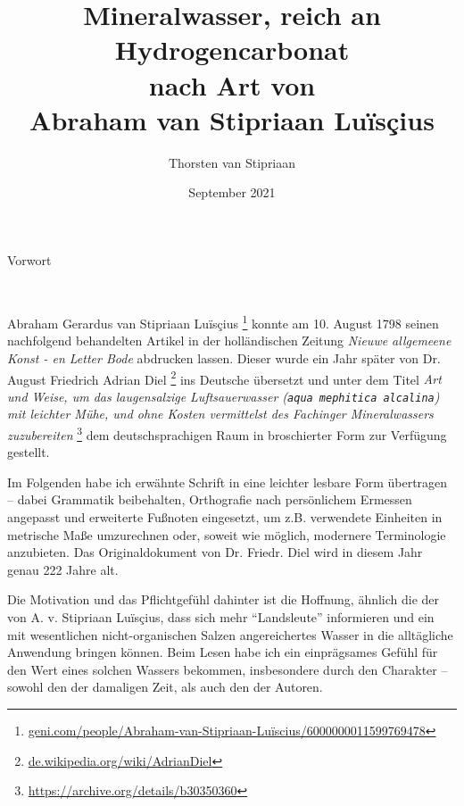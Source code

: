 \documentclass[a5paper,8pt]{scrbook}
\title{Mineralwasser, reich an Hydrogencarbonat\\nach Art von\\Abraham van Stipriaan Luïsçius}
\author{Thorsten van Stipriaan}
\date{September 2021}
\begin{document}

\maketitle

\newpage

{\centering
{\Large Vorwort}\vfill

\begin{minipage}{4cm}
  \centering
  \hrulefill\\
\end{minipage}

}
\vfill
Abraham Gerardus van Stipriaan Luïsçius%
\footnote{\href{https://web.archive.org/web/20210927050342/https://www.geni.com/people/Abraham-van-Stipriaan-Luïscius/6000000011599769478}
{geni.com/people/Abraham-van-Stipriaan-Luïscius/6000000011599769478}}
konnte am 10. August 1798
seinen nachfolgend behandelten Artikel in der holländischen Zeitung
\emph{Nieuwe allgemeene Konst - en Letter Bode}
abdrucken lassen.
Dieser wurde ein Jahr später
von Dr. August Friedrich Adrian Diel%
\footnote{\href{https://web.archive.org/web/20160828042236/https://de.wikipedia.org/wiki/Adrian_Diel}
{de.wikipedia.org/wiki/Adrian\textunderscore Diel}}
ins Deutsche übersetzt und unter dem Titel
\emph{Art und Weise,
um das laugensalzige Luftsauerwasser
(\texttt{aqua mephitica alcalina})
mit leichter Mühe, und ohne Kosten
vermittelst des Fachinger Mineralwassers zuzubereiten}%
\footnote{\href{https://archive.org/details/b30350360}
{https://archive.org/details/b30350360}}
dem deutschsprachigen Raum in broschierter Form
zur Verfügung gestellt.

Im Folgenden habe ich erwähnte Schrift
in eine leichter lesbare Form übertragen --
dabei Grammatik beibehalten,
Orthografie nach persönlichem Ermessen angepasst
und erweiterte Fußnoten eingesetzt,
um z.B. verwendete Einheiten in metrische Maße umzurechnen
oder, soweit wie möglich, modernere Terminologie anzubieten.
Das Originaldokument von Dr. Friedr. Diel
wird in diesem Jahr genau 222 Jahre alt.

Die Motivation und das Pflichtgefühl dahinter ist
die Hoffnung,
ähnlich die der von A. v. Stipriaan Luïsçius,
dass sich mehr ``Landsleute'' informieren
und ein mit wesentlichen nicht-organischen Salzen %
angereichertes Wasser
in die alltägliche Anwendung bringen können.
Beim Lesen habe ich ein einprägsames Gefühl für den Wert
eines solchen Wassers bekommen,
insbesondere durch den Charakter --
sowohl den der damaligen Zeit, als auch den der Autoren.
\end{document}
